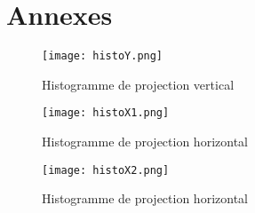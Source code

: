 \documentclass[a4paper]{article}
\begin{document}
	\section*{Annexes}
		\begin{figure}[H]
			\caption{Histogramme de projection vertical}
			\texttt{[image: histoY.png]}
			\centering
			\label{fig:histoY}
		\end{figure}
		\begin{figure}[H]
			\caption{Histogramme de projection horizontal}
			\texttt{[image: histoX1.png]}
			\centering
			\label{fig:histoX1}
		\end{figure}
		\begin{figure}[H]
			\caption{Histogramme de projection horizontal}
			\texttt{[image: histoX2.png]}
			\centering
			\label{fig:histoX2}
		\end{figure}
\end{document}

